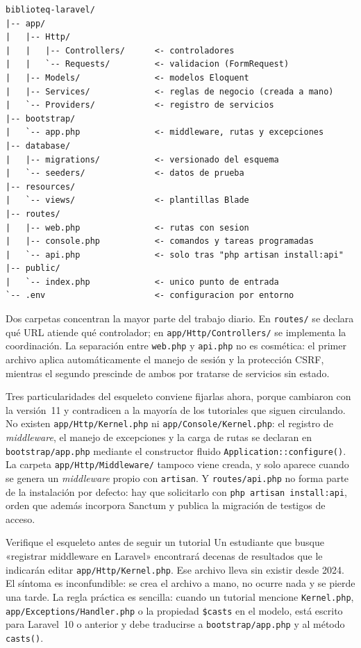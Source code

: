 \documentclass[11pt,a4paper,openany]{book}
\begin{document}
\begin{lstlisting}[style=plano,caption={Estructura de carpetas relevante de un proyecto Laravel.},label={lst:u4:estructura}]
biblioteq-laravel/
|-- app/
|   |-- Http/
|   |   |-- Controllers/      <- controladores
|   |   `-- Requests/         <- validacion (FormRequest)
|   |-- Models/               <- modelos Eloquent
|   |-- Services/             <- reglas de negocio (creada a mano)
|   `-- Providers/            <- registro de servicios
|-- bootstrap/
|   `-- app.php               <- middleware, rutas y excepciones
|-- database/
|   |-- migrations/           <- versionado del esquema
|   `-- seeders/              <- datos de prueba
|-- resources/
|   `-- views/                <- plantillas Blade
|-- routes/
|   |-- web.php               <- rutas con sesion
|   |-- console.php           <- comandos y tareas programadas
|   `-- api.php               <- solo tras "php artisan install:api"
|-- public/
|   `-- index.php             <- unico punto de entrada
`-- .env                      <- configuracion por entorno
\end{lstlisting}

Dos carpetas concentran la mayor parte del trabajo diario. En \texttt{routes/} se declara qué URL atiende qué controlador; en \texttt{app/Http/Controllers/} se implementa la coordinación. La separación entre \texttt{web.php} y \texttt{api.php} no es cosmética: el primer archivo aplica automáticamente el manejo de sesión y la protección CSRF, mientras el segundo prescinde de ambos por tratarse de servicios sin estado.

Tres particularidades del esqueleto conviene fijarlas ahora, porque cambiaron con la versión~11 y contradicen a la mayoría de los tutoriales que siguen circulando. No existen \texttt{app/Http/Kernel.php} ni \texttt{app/Console/Kernel.php}: el registro de \emph{middleware}, el manejo de excepciones y la carga de rutas se declaran en \texttt{bootstrap/app.php} mediante el constructor fluido \texttt{Application::configure()}. La carpeta \texttt{app/Http/Middleware/} tampoco viene creada, y solo aparece cuando se genera un \emph{middleware} propio con \texttt{artisan}. Y \texttt{routes/api.php} no forma parte de la instalación por defecto: hay que solicitarlo con \texttt{php artisan install:api}, orden que además incorpora Sanctum y publica la migración de testigos de acceso.

\begin{cajaadvertencia}{Verifique el esqueleto antes de seguir un tutorial}
	Un estudiante que busque «registrar middleware en Laravel» encontrará decenas de resultados que le indicarán editar \texttt{app/Http/Kernel.php}. Ese archivo lleva sin existir desde 2024. El síntoma es inconfundible: se crea el archivo a mano, no ocurre nada y se pierde una tarde. La regla práctica es sencilla: cuando un tutorial mencione \texttt{Kernel.php}, \texttt{app/Exceptions/Handler.php} o la propiedad \texttt{\$casts} en el modelo, está escrito para Laravel~10 o anterior y debe traducirse a \texttt{bootstrap/app.php} y al método \texttt{casts()}.
\end{cajaadvertencia}
\end{document}
